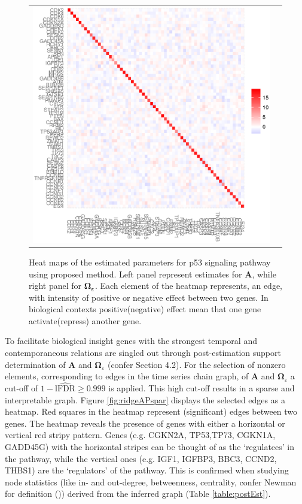 \documentclass[a4paper]{article}
\begin{document}
\begin{figure}[h!]
\begin{tabular}{cc}
\includegraphics[scale=0.33]{ridgeP.eps}\\
\end{tabular}
\caption{ Heat maps of the estimated parameters for p53 signaling pathway using proposed method. Left panel represent estimates for $\mathbf{A}$, while right panel for $\boldsymbol{\Omega_{\varepsilon}}$. Each element of the heatmap represents, an edge, with intensity of positive or negative effect between two genes. In biological contexts positive(negative) effect mean that one gene activate(repress) another gene.
}
\label{fig:ridgeAP}
\end{figure}

To facilitate biological insight genes with the strongest temporal and contemporaneous relations are singled out through post-estimation support determination of $\mathbf{A}$ and $\mathbf{\Omega}_{\varepsilon}$ (confer Section 4.2). For the selection of nonzero elements, corresponding to edges in the time series chain graph, of $\mathbf{A}$ and $\mathbf{\Omega}_{\varepsilon}$ a cut-off of $1-\widehat{\textrm{lFDR}}\geq 0.999$ is applied. This high cut-off results in a sparse and interpretable graph. Figure \ref{fig:ridgeAPspar} displays the selected edges as a heatmap. Red squares in the heatmap represent (significant) edges between two genes. The heatmap reveals the presence of genes with either a horizontal or vertical red stripy pattern. Genes (e.g. CGKN2A, TP53,TP73, CGKN1A, GADD45G) with the horizontal stripes can be thought of as the `regulatees' in the pathway, while the vertical ones (e.g. IGF1, IGFBP3, BBC3, CCND2, THBS1) are the `regulators' of the pathway. This is confirmed when studying node statistics (like in- and out-degree, betweenness, centrality, confer Newman for definition (\cite{Newman2010})) derived from the inferred graph (Table \ref{table:postEst}).
\end{document}
